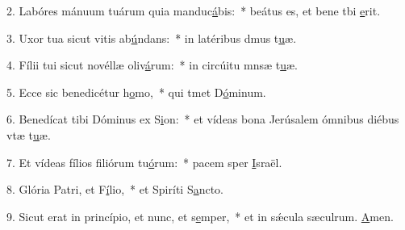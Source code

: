 2. Labóres mánuum tuárum quia manduc\uline{á}bis:~* beátus es, et bene tbi \uline{e}rit.\par 
3. Uxor tua sicut vitis ab\uline{ú}ndans:~* in latéribus dmus t\uline{u}æ.\par 
4. Fílii tui sicut novéllæ oliv\uline{á}rum:~* in circúitu mnsæ t\uline{u}æ.\par 
5. Ecce sic benedicétur h\uline{o}mo,~* qui tmet D\uline{ó}minum.\par 
6. Benedícat tibi Dóminus ex S\uline{i}on:~* et vídeas bona Jerúsalem ómnibus diébus vtæ t\uline{u}æ.\par 
7. Et vídeas fílios filiórum tu\uline{ó}rum:~* pacem sper \uline{I}sraël.\par 
8. Glória Patri, et F\uline{í}lio,~* et Spiríti S\uline{a}ncto.\par 
9. Sicut erat in princípio, et nunc, et s\uline{e}mper,~* et in sǽcula sæculrum. \uline{A}men.\par 
